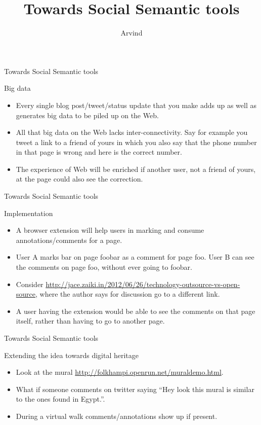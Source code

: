 \documentclass[''urlcolor=red'']{beamer}
\title{Towards Social Semantic tools}
\author{Arvind}
\begin{document}
\begin{frame}
  \titlepage
\end{frame}

\begin{frame}{Towards Social Semantic tools}
  \begin{block}{Big data}
    \begin{itemize}
    \item Every single blog post/tweet/status update that you make adds up as well as generates big data to be piled up on the Web.
    \item All that big data on the Web lacks inter-connectivity. Say for example you tweet a link to a friend of yours in which you also say that the phone number in that page is wrong and here is the correct number.
    \item The experience of Web will be enriched if another user, not a friend of yours, at the page could also see the correction.
    \end{itemize}
  \end{block}
\end{frame}

\begin{frame}{Towards Social Semantic tools}
  \begin{block}{Implementation}
    \begin{itemize}
    \item A browser extension will help users in marking and consume annotations/comments for a page.
    \item User A marks bar on page foobar as a comment for page foo.  User B can see the comments on page foo, without ever going to foobar.
    \item Consider \url{http://jace.zaiki.in/2012/06/26/technology-outsource-vs-open-source}, where the author says for discussion go to a different link.
    \item A user having the extension would be able to see the comments on that page itself, rather than having to go to another page.
    \end{itemize}
  \end{block}
\end{frame}

\begin{frame}{Towards Social Semantic tools}
  \begin{block}{Extending the idea towards digital heritage}
    \begin{itemize}
    \item Look at the mural \url{http://folkhampi.openrun.net/muraldemo.html}.
    \item What if someone comments on twitter saying ``Hey look this mural is similar to the ones found in Egypt.''.
    \item During a virtual walk comments/annotations show up if present.
    \end{itemize}
  \end{block}
\end{frame}
\end{document}
